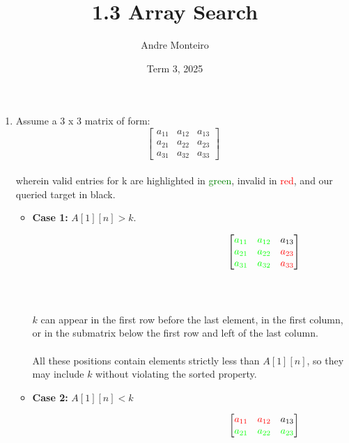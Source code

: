 \documentclass[12pt]{article}
\title{1.3 Array Search}
\author{Andre Monteiro}
\date{Term 3, 2025}
\begin{document}
\maketitle
\newpage
\begin{enumerate}
    \item Assume a 3 x 3 matrix of form: 
    \[
    \begin{bmatrix}
    a_{11} & a_{12} & a_{13} \\
    a_{21} & a_{22} & a_{23} \\
    a_{31} & a_{32} & a_{33} 
    \end{bmatrix}
    \] 
    \\ wherein valid entries for k are highlighted in \textcolor{green}{green}, invalid in \textcolor{red}{red}, and our queried target in black.
    \begin{itemize}
        \item \textbf{Case 1:} $A[1][n] > k$. \\
        \begin{varwidth}{\textwidth}
        \[ \hspace{15em}
        \begin{bmatrix}
        \textcolor{green}{a_{11}} & \textcolor{green}{a_{12}} & a_{13} \\
        \textcolor{green}{a_{21}} & \textcolor{green}{a_{22}} & \textcolor{red}{a_{23}} \\
        \textcolor{green}{a_{31}} & \textcolor{green}{a_{32}} & \textcolor{red}{a_{33}}
        \end{bmatrix}
        \] \\
        \end{varwidth}
        \\ 
        $k$ can appear in the first row before the last element, in the first column, or in the submatrix below the first row and left of the last column.  
        \\\\ All these positions contain elements strictly less than $A[1][n]$, so they may include $k$ without violating the sorted property.
        \item \textbf{Case 2:} $A[1][n] < k$ \\
        \begin{varwidth}{\textwidth}
        \[ \hspace{15em}
        \begin{bmatrix}
        \textcolor{red}{a_{11}} & \textcolor{red}{a_{12}} & a_{13} \\
        \textcolor{green}{a_{21}} & \textcolor{green}{a_{22}} & \textcolor{green}{a_{23}} \\

\end{bmatrix}\]
\end{varwidth}
\end{itemize}
\end{enumerate}
\end{document}
